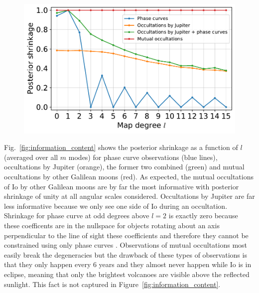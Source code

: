 \documentclass[modern]{aastex62}
\begin{document}
\begin{figure}[t!]
    \begin{centering}
    \includegraphics[width=\linewidth]{figures/information_content.pdf}
    \end{centering}
\end{figure}

Fig.~\ref{fig:information_content} shows the posterior shrinkage as a function of $l$ (averaged over all $m$ modes) for phase curve observations (blue lines), occultations by Jupiter (orange), the former two combined (green) and mutual occultations by other Galilean moons (red).
As expected, the mutual occultations of Io by other Galilean moons are by far the most informative with posterior shrinkage of unity at all angular scales considered. 
Occultations by Jupiter are far less informative because we only see one side of Io during an occultation.
Shrinkage for phase curve at odd degrees above $l=2$ is exactly zero because these coefficents are in the nullspace for objects rotating about an axis perpendicular to the line of sight these coefficients and therefore they cannot be constrained using only phase curves \citep{luger2021}. 
Observations of mutual occultations most easily break the degeneracies but the drawback of these types of observations is that they only happen every 6 years and they almost never happen while Io is in eclipse, meaning that only the brightest volcanoes are visible above the reflected sunlight.
This fact is not captured in Figure~\ref{fig:information_content}. 
\end{document}
